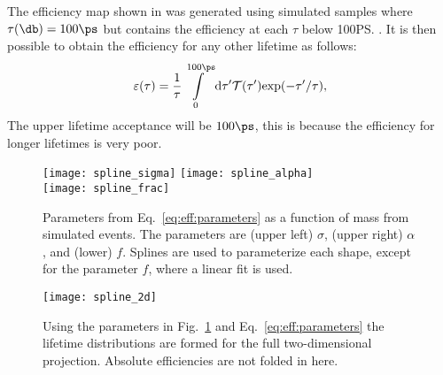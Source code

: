 The efficiency map shown in  was generated using simulated samples where
$\tau(\db)=100\ps$ but contains the efficiency at each $\tau$ below 100\ps.
It is then possible to obtain the efficiency for any other lifetime as follows:
\begin{equation}
  \varepsilon(\tau) = \frac{1}{\tau}\int\limits_0^{100\ps} {\rm d}\tau^{\prime} \mathcal{T}(\tau^{\prime}){\rm exp}(-\tau^{\prime}/\tau),
\end{equation}
The upper lifetime acceptance will be $100\ps$, this is because the efficiency for longer lifetimes
is very poor.


\begin{figure}
  \begin{center}
    \texttt{[image: spline\_sigma]}
    \texttt{[image: spline\_alpha]}\\
    \texttt{[image: spline\_frac]}
    \caption{
      Parameters from Eq.~\protect\ref{eq:eff:parameters} as a function of mass from
      simulated events.
      The parameters are
      (upper left) $\sigma$,
      (upper right) $\alpha$, and
      (lower) $f$.
      Splines are used to parameterize each shape, except for the parameter $f$, where a
      linear fit is used.
    }
    \label{fig:eff:spline}
  \end{center}
\end{figure}

\begin{figure}
  \begin{center}
    \texttt{[image: spline\_2d]}
    \caption{
      Using the parameters in Fig.~\ref{fig:eff:spline} and Eq.~\protect\ref{eq:eff:parameters} the
      lifetime distributions are formed for the full two-dimensional projection.
      Absolute efficiencies are not folded in here.
    }
    \label{fig:eff:effmap}
  \end{center}
\end{figure}












